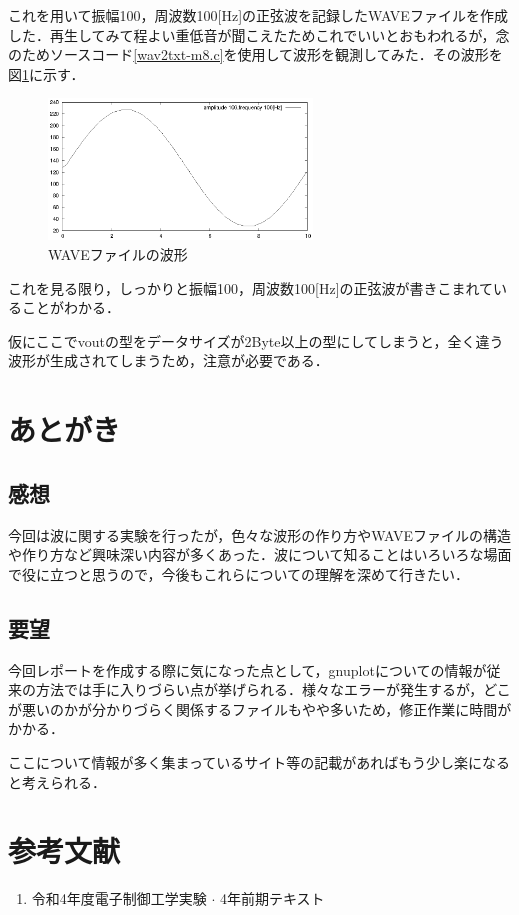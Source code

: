 \documentclass[titlepage]{jarticle}
\begin{document}
これを用いて振幅100，周波数100[Hz]の正弦波を記録したWAVEファイルを作成した．再生してみて程よい重低音が聞こえたためこれでいいとおもわれるが，念のためソースコード\ref{wav2txt-m8.c}を使用して波形を観測してみた．その波形を図\ref{100f100_eps}に示す．
\begin{figure}[H]
  \centering
  \includegraphics[width=7cm]{EPS/100f100.eps}
  \caption{WAVEファイルの波形}
  \label{100f100_eps}
\end{figure}

これを見る限り，しっかりと振幅100，周波数100[Hz]の正弦波が書きこまれていることがわかる．

仮にここでvoutの型をデータサイズが2Byte以上の型にしてしまうと，全く違う波形が生成されてしまうため，注意が必要である．
\section{あとがき}
\subsection{感想}
今回は波に関する実験を行ったが，色々な波形の作り方やWAVEファイルの構造や作り方など興味深い内容が多くあった．波について知ることはいろいろな場面で役に立つと思うので，今後もこれらについての理解を深めて行きたい．
\subsection{要望}
今回レポートを作成する際に気になった点として，gnuplotについての情報が従来の方法では手に入りづらい点が挙げられる．様々なエラーが発生するが，どこが悪いのかが分かりづらく関係するファイルもやや多いため，修正作業に時間がかかる．

ここについて情報が多く集まっているサイト等の記載があればもう少し楽になると考えられる．
\section*{参考文献}
\begin{enumerate}
  \item 令和4年度電子制御工学実験 $\cdot$ 4年前期テキスト
\end{enumerate}
\end{document}
